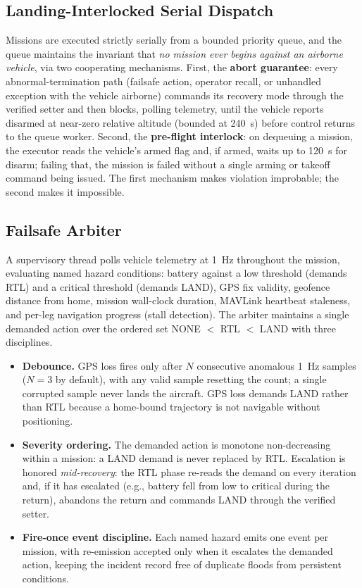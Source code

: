 \documentclass[journal]{IEEEtran}
\begin{document}
\subsection{Landing-Interlocked Serial Dispatch}

Missions are executed strictly serially from a bounded priority queue, and
the queue maintains the invariant that \emph{no mission ever begins against
an airborne vehicle}, via two cooperating mechanisms. First, the
\textbf{abort guarantee}: every abnormal-termination path (failsafe action,
operator recall, or unhandled exception with the vehicle airborne) commands
its recovery mode through the verified setter and then blocks, polling
telemetry, until the vehicle reports disarmed at near-zero relative altitude
(bounded at 240~s) before control returns to the queue worker. Second, the
\textbf{pre-flight interlock}: on dequeuing a mission, the executor reads
the vehicle's armed flag and, if armed, waits up to 120~s for disarm;
failing that, the mission is failed without a single arming or takeoff
command being issued. The first mechanism makes violation improbable; the
second makes it impossible.

\subsection{Failsafe Arbiter}

A supervisory thread polls vehicle telemetry at 1~Hz throughout the mission,
evaluating named hazard conditions: battery against a low threshold (demands
RTL) and a critical threshold (demands LAND), GPS fix validity, geofence
distance from home, mission wall-clock duration, MAVLink heartbeat
staleness, and per-leg navigation progress (stall detection). The arbiter
maintains a single demanded action over the ordered set NONE $<$ RTL $<$
LAND with three disciplines.
\begin{itemize}
\item \textbf{Debounce.} GPS loss fires only after $N$ consecutive anomalous
1~Hz samples ($N = 3$ by default), with any valid sample resetting the
count; a single corrupted sample never lands the aircraft. GPS loss demands
LAND rather than RTL because a home-bound trajectory is not navigable
without positioning.
\item \textbf{Severity ordering.} The demanded action is monotone
non-decreasing within a mission: a LAND demand is never replaced by RTL.
Escalation is honored \emph{mid-recovery}: the RTL phase re-reads the
demand on every iteration and, if it has escalated (e.g., battery fell from
low to critical during the return), abandons the return and commands LAND
through the verified setter.
\item \textbf{Fire-once event discipline.} Each named hazard emits one event
per mission, with re-emission accepted only when it escalates the demanded
action, keeping the incident record free of duplicate floods from persistent
conditions.
\end{itemize}
\end{document}
